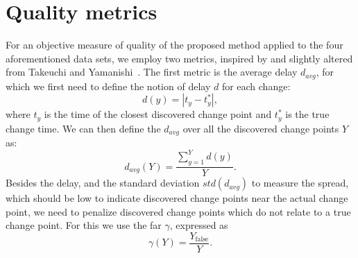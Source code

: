 \section{Quality metrics}\label{sec:artificial_data_quality_metrics}
For an objective measure of quality of the proposed method applied to the four aforementioned data sets, we employ two metrics, inspired by and slightly altered from Takeuchi and Yamanishi~\cite{takeuchi2006unifying}.
The first metric is the average delay $d_{avg}$, for which we first need to define the notion of delay $d$ for each change:
\begin{equation}\label{eq:delay}
  d(y) = |t_y - t_y^*|,
\end{equation}
where $t_y$ is the time of the closest discovered change point and $t_y^*$ is the true change time.
We can then define the $d_{avg}$ over all the discovered change points $Y$ as:
\begin{equation}\label{eq:average_delay}
  d_{avg}(Y) = \frac{\sum_{y=1}^Y d(y)}{Y}.
\end{equation}
Besides the delay, and the standard deviation $std(d_{avg})$ to measure the spread, which should be low to indicate discovered change points near the actual change point, we need to penalize discovered change points which do not relate to a true change point.
For this we use the \acrlong{far} $\gamma$, expressed as
\begin{equation}\label{eq:false_alarm_rate}
  \gamma(Y) = \frac{Y_{\operatorname*{false}}}{Y}.
\end{equation}

